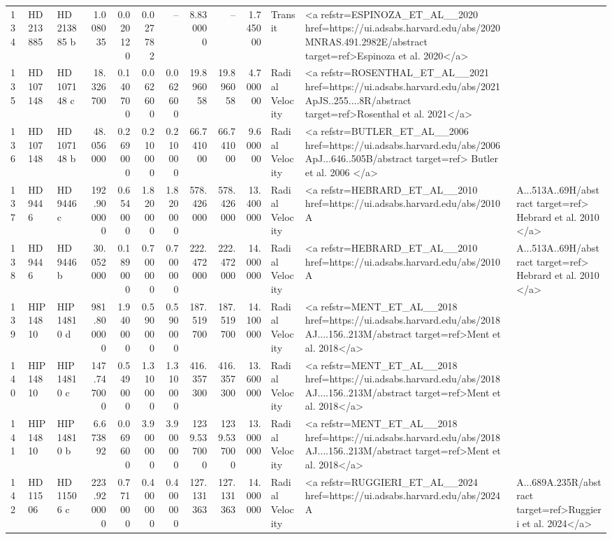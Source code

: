 \begin{tabular}{lllrrrrrrrll}
134 & HD 213885 & HD 213885 b & 1.008035 & 0.020120 & 0.027782 & -- & 8.830000 & -- & 1.745000 & Transit & <a refstr=ESPINOZA_ET_AL__2020 href=https://ui.adsabs.harvard.edu/abs/2020MNRAS.491.2982E/abstract target=ref>Espinoza et al. 2020</a> \\
135 & HD 107148 & HD 107148 c & 18.326700 & 0.140700 & 0.062600 & 0.062600 & 19.896058 & 19.896058 & 4.700000 & Radial Velocity & <a refstr=ROSENTHAL_ET_AL__2021 href=https://ui.adsabs.harvard.edu/abs/2021ApJS..255....8R/abstract target=ref>Rosenthal et al. 2021</a> \\
136 & HD 107148 & HD 107148 b & 48.056000 & 0.269000 & 0.210000 & 0.210000 & 66.741000 & 66.741000 & 9.600000 & Radial Velocity & <a refstr=BUTLER_ET_AL__2006 href=https://ui.adsabs.harvard.edu/abs/2006ApJ...646..505B/abstract target=ref> Butler et al. 2006 </a> \\
137 & HD 9446 & HD 9446 c & 192.900000 & 0.654000 & 1.820000 & 1.820000 & 578.426000 & 578.426000 & 13.400000 & Radial Velocity & <a refstr=HEBRARD_ET_AL__2010 href=https://ui.adsabs.harvard.edu/abs/2010A&A...513A..69H/abstract target=ref> Hebrard et al. 2010 </a> \\
138 & HD 9446 & HD 9446 b & 30.052000 & 0.189000 & 0.700000 & 0.700000 & 222.472000 & 222.472000 & 14.000000 & Radial Velocity & <a refstr=HEBRARD_ET_AL__2010 href=https://ui.adsabs.harvard.edu/abs/2010A&A...513A..69H/abstract target=ref> Hebrard et al. 2010 </a> \\
139 & HIP 14810 & HIP 14810 d & 981.800000 & 1.940000 & 0.590000 & 0.590000 & 187.519700 & 187.519700 & 14.100000 & Radial Velocity & <a refstr=MENT_ET_AL__2018 href=https://ui.adsabs.harvard.edu/abs/2018AJ....156..213M/abstract target=ref>Ment et al. 2018</a> \\
140 & HIP 14810 & HIP 14810 c & 147.747000 & 0.549000 & 1.310000 & 1.310000 & 416.357300 & 416.357300 & 13.600000 & Radial Velocity & <a refstr=MENT_ET_AL__2018 href=https://ui.adsabs.harvard.edu/abs/2018AJ....156..213M/abstract target=ref>Ment et al. 2018</a> \\
141 & HIP 14810 & HIP 14810 b & 6.673892 & 0.069600 & 3.900000 & 3.900000 & 1239.537000 & 1239.537000 & 13.000000 & Radial Velocity & <a refstr=MENT_ET_AL__2018 href=https://ui.adsabs.harvard.edu/abs/2018AJ....156..213M/abstract target=ref>Ment et al. 2018</a> \\
142 & HD 11506 & HD 11506 c & 223.920000 & 0.771000 & 0.400000 & 0.400000 & 127.131363 & 127.131363 & 14.000000 & Radial Velocity & <a refstr=RUGGIERI_ET_AL__2024 href=https://ui.adsabs.harvard.edu/abs/2024A&A...689A.235R/abstract target=ref>Ruggieri et al. 2024</a> \\

\end{tabular}
